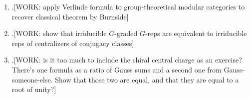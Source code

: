 \begin{enumerate}[\thesection .1.]

\item .[WORK: apply Verlinde formula to group-theoretical modular categories to recover classical theorem by Burnside]

\item .[WORK: show that irriducible $G$-graded $G$-reps are equivalent to irriducible reps of centralizers of conjugacy classes]

\item .[WORK: is it too much to include the chiral central charge as an exercise? There's one formula as a ratio of Gauss sums and a second one from Gauss-someone-else. Show that those two are equal, and that they are equal to a root of unity?]

\end{enumerate}
